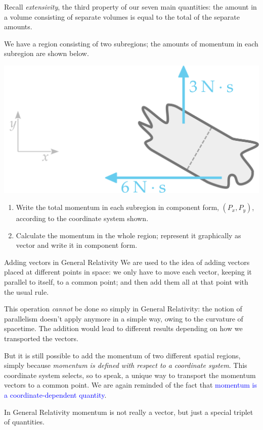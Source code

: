 \documentclass[a4paper,12pt,%
onecolumn,oneside,%
british%
]{memoir}
\renewcommand*{\|}[1][]{\nonscript\:#1\vert\nonscript\:\mathopen{}}
\newcommand*{\sect}{\S}%
\renewcommand*{\autoref}[2]{\sidepar{\vspace{-1ex}\footnotesize{\color{blue}\faIcon{%
angle-right%
}\enspace\sect\,\ref{#1} page\,\pageref{#1}}}\textcolor{blue}{#2}}
\begin{document}
\bigskip


\begin{exercise}
  Recall \emph{extensivity}, the third property of our seven main quantities: the amount in a volume consisting of separate volumes is equal to the total of the separate amounts.

We have a region consisting of two subregions; the amounts of momentum in each subregion are shown below.
  \begin{center}
    \includegraphics[width=0.5\linewidth]{images/exercise_momentumsum.pdf}
  \end{center}
  \begin{enumerate}[exerc]
  \item Write the total momentum in each subregion in component form, $(P_{x}, P_{y})$, according to the coordinate system shown.
  \item Calculate the momentum in the whole region; represent it graphically as vector and write it in component form.
  \end{enumerate}
\end{exercise}

\begin{extra}{Adding vectors in General Relativity}
  We are used to the idea of adding vectors placed at different points in space: we only have to move each vector, keeping it parallel to itself, to a common point; and then add them all at that point with the usual rule.

  This operation \emph{cannot} be done so simply in General Relativity: the notion of parallelism doesn't apply anymore in a simple way, owing to the curvature of spacetime. The addition would lead to different results depending on how we transported the vectors.

  But it is still possible to add the momentum of two different spatial regions, simply because \emph{momentum is defined with respect to a coordinate system}. This coordinate system selects, so to speak, a unique way to transport the momentum vectors to a common point. We are again reminded of the fact that \autoref{sec:energy_momentum_angmomentum_coords}{momentum is a coordinate-dependent quantity}.

  In General Relativity momentum is not really a vector, but just a special triplet of quantities.

\end{extra}
\end{document}
